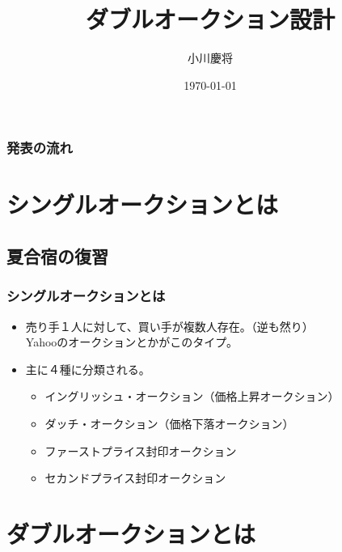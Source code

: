 \documentclass[dvipdfmx,12pt]{beamer}
\title{ダブルオークション設計}
\author{小川慶将}
\date{\today}
\begin{document}
\begin{frame}\frametitle{}
 \titlepage
\end{frame}

\begin{frame}\frametitle{発表の流れ}
 \tableofcontents
\end{frame}

\section{シングルオークションとは}
\subsection{夏合宿の復習}
\begin{frame}
\frametitle{シングルオークションとは}
\begin{itemize}\setlength{\parskip}{0.5em}
\item
売り手１人に対して、買い手が複数人存在。（逆も然り）\\
Yahooのオークションとかがこのタイプ。
\item
主に４種に分類される。
\begin{itemize}\setlength{\parskip}{0.5em}
\item
イングリッシュ・オークション（価格上昇オークション）
\item
ダッチ・オークション（価格下落オークション）
\item
ファーストプライス封印オークション
\item
セカンドプライス封印オークション
\end{itemize}
\end{itemize}
\end{frame}

\section{ダブルオークションとは}
\end{document}
